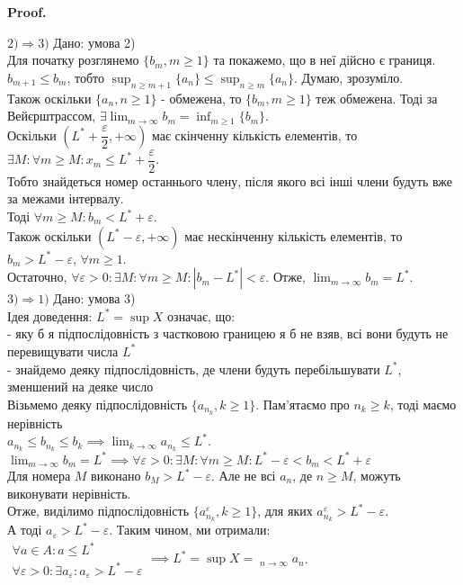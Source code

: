 \documentclass[a4paper, 14pt]{article}
\makeatletter
\DeclareMathOperator*\uplim{\overline{lim}}
\def\huge{\displaystyle}
\def\qed{$\blacksquare$}
\theoremstyle{theoremdd}
\theoremstyle{theoremdd}
\theoremstyle{theoremdd}
\theoremstyle{theoremdd}
\theoremstyle{theoremdd}
\theoremstyle{theoremdd}
\theoremstyle{theoremdd}
\theoremstyle{theoremdd}
\renewenvironment{proof}[1][Proof.\\]{\par
\pushQED{\hfill \qed}%
\normalfont \topsep6\p@\@plus6\p@\relax
\trivlist
\item\relax
{\bfseries
#1\@addpunct{.}}\hspace\labelsep\ignorespaces
}{%
\popQED\endtrivlist\@endpefalse
}
\makeatother
\begin{document}
\begin{proof}
	$\boxed{2) \Rightarrow 3)}$ Дано: умова 2)\\
	Для початку розглянемо $\{b_m, m \geq 1\}$ та покажемо, що в неї дійсно є границя.\\
	$b_{m+1} \leq b_m$, тобто $\huge \sup_{n \geq m+1} \{a_n\} \leq \sup_{n \geq m} \{a_n\}$. Думаю, зрозуміло.\\
	Також оскільки $\{a_n, n \geq 1\}$ - обмежена, то $\{b_m, m \geq 1 \}$ теж обмежена. Тоді за Вейєрштрассом, $\exists \huge \lim_{m \to \infty} b_m = \inf_{m \geq 1} \{b_m\}$.\\
	Оскільки $(L^*+\dfrac{\varepsilon}{2}, + \infty)$ має скінченну кількість елементів, то $\exists M: \forall m \geq M: x_m \leq L^* + \dfrac{\varepsilon}{2}$.\\
	Тобто знайдеться номер останнього члену, після якого всі інші члени будуть вже за межами інтервалу.\\
	Тоді $\forall m \geq M: b_m < L^* + \varepsilon$.\\
	Також оскільки $(L^*-\varepsilon, + \infty)$ має нескінченну кількість елементів, то $b_m > L^* - \varepsilon$, $\forall m \geq 1$.\\
	Остаточно, $\forall \varepsilon > 0: \exists M: \forall m \geq M: |b_m - L^*| < \varepsilon$. Отже, $\huge \lim_{m \to \infty} b_m = L^*$.
	\bigskip \\
	
	$\boxed{3) \Rightarrow 1)}$ Дано: умова 3)\\
	Ідея доведення: $L^* = \sup X$ означає, що:\\
	- яку б я підпослідовність з частковою границею я б не взяв, всі вони будуть не перевищувати числа $L^*$\\
	- знайдемо деяку підпослідовність, де члени будуть перебільшувати $L^*$, зменшений на деяке число\\
	Візьмемо деяку підпослідовність $\{a_{n_k}, k \geq 1\}$. Пам'ятаємо про $n_k \geq k$, тоді маємо нерівність \\ $a_{n_k} \leq b_{n_k} \leq b_k \implies \huge \lim_{k \to \infty} a_{n_k} \leq L^*$.\\
	$\huge \lim_{m \to \infty} b_m = L^* \implies \forall \varepsilon > 0: \exists M: \forall m \geq M: L^*-\varepsilon < b_m < L^*+\varepsilon$\\
	Для номера $M$ виконано $b_M > L^*-\varepsilon$. Але не всі $a_n$, де $n \geq M$, можуть виконувати нерівність.\\
	Отже, виділимо підпослідовність $\{a_{n_k}^{\varepsilon}, k \geq 1\}$, для яких
	$a_{n_k}^{\varepsilon} > L^* - \varepsilon$.\\
	А тоді $a_{\varepsilon} > L^* - \varepsilon$.
	Таким чином, ми отримали:\\
	$\begin{gathered}
	\forall a \in A: a \leq L^* \\
	\forall \varepsilon > 0: \exists a_{\varepsilon}: a_{\varepsilon} > L^* - \varepsilon
	\end{gathered} \implies L^* = \huge \sup X = \uplim_{n \to \infty} a_n$.
	\end{proof}
	
\end{document}
